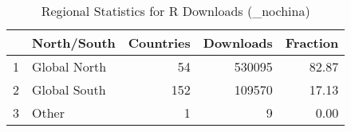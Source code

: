 \begin{table}[ht]
\centering
\begin{tabular}{rlrrr}
  \hline
 & North/South & Countries & Downloads & Fraction \\ 
  \hline
1 & Global North &  54 & 530095 & 82.87 \\ 
  2 & Global South & 152 & 109570 & 17.13 \\ 
  3 & Other &   1 &   9 & 0.00 \\ 
   \hline
\end{tabular}
\caption{Regional Statistics for R Downloads (_nochina)} 
\label{tab:r_downloads_global_stats_select_nochina}
\end{table}

